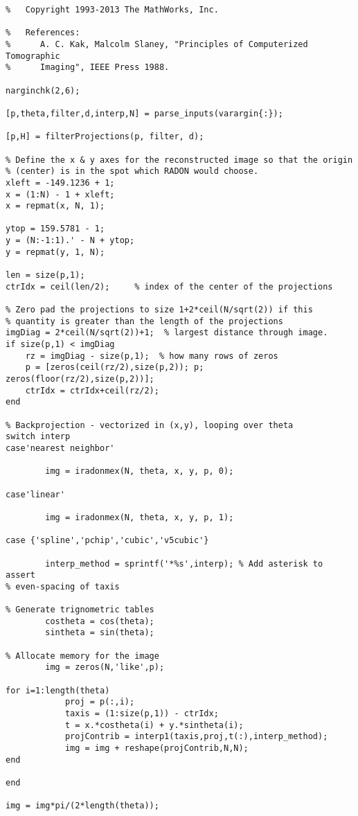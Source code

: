 \begin{lstlisting}
%   Copyright 1993-2013 The MathWorks, Inc.

%   References:
%      A. C. Kak, Malcolm Slaney, "Principles of Computerized Tomographic
%      Imaging", IEEE Press 1988.

narginchk(2,6);

[p,theta,filter,d,interp,N] = parse_inputs(varargin{:});

[p,H] = filterProjections(p, filter, d);

% Define the x & y axes for the reconstructed image so that the origin
% (center) is in the spot which RADON would choose.
xleft = -149.1236 + 1;
x = (1:N) - 1 + xleft;
x = repmat(x, N, 1);

ytop = 159.5781 - 1;
y = (N:-1:1).' - N + ytop;
y = repmat(y, 1, N);

len = size(p,1);
ctrIdx = ceil(len/2);     % index of the center of the projections

% Zero pad the projections to size 1+2*ceil(N/sqrt(2)) if this
% quantity is greater than the length of the projections
imgDiag = 2*ceil(N/sqrt(2))+1;  % largest distance through image.
if size(p,1) < imgDiag
    rz = imgDiag - size(p,1);  % how many rows of zeros
    p = [zeros(ceil(rz/2),size(p,2)); p; zeros(floor(rz/2),size(p,2))];
    ctrIdx = ctrIdx+ceil(rz/2);
end

% Backprojection - vectorized in (x,y), looping over theta
switch interp
case'nearest neighbor'

        img = iradonmex(N, theta, x, y, p, 0);

case'linear'

        img = iradonmex(N, theta, x, y, p, 1);

case {'spline','pchip','cubic','v5cubic'}

        interp_method = sprintf('*%s',interp); % Add asterisk to assert
% even-spacing of taxis

% Generate trignometric tables
        costheta = cos(theta);
        sintheta = sin(theta);

% Allocate memory for the image
        img = zeros(N,'like',p);        

for i=1:length(theta)
            proj = p(:,i);
            taxis = (1:size(p,1)) - ctrIdx;
            t = x.*costheta(i) + y.*sintheta(i);
            projContrib = interp1(taxis,proj,t(:),interp_method);
            img = img + reshape(projContrib,N,N);
end

end

img = img*pi/(2*length(theta));


\end{lstlisting}
